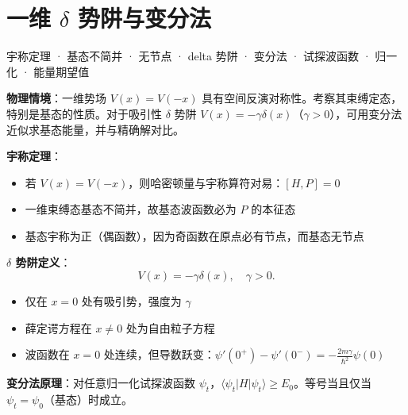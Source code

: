 
\section{一维 $\delta$ 势阱与变分法}
\label{sec:1d-delta-potential}

\begin{tipbox}[关键词标签]
宇称定理 · 基态不简并 · 无节点 · delta 势阱 · 变分法 · 试探波函数 · 归一化 · 能量期望值
\end{tipbox}

\begin{modelbox}[模型：一维对称势场中的束缚态]
\textbf{物理情境}：一维势场 $V(x)=V(-x)$ 具有空间反演对称性。考察其束缚定态，特别是基态的性质。对于吸引性 $\delta$ 势阱 $V(x)=-\gamma\delta(x)$（$\gamma>0$），可用变分法近似求基态能量，并与精确解对比。

\textbf{宇称定理}：
\begin{itemize}[nosep]
    \item 若 $V(x)=V(-x)$，则哈密顿量与宇称算符对易：$[H,P]=0$
    \item 一维束缚态基态不简并，故基态波函数必为 $P$ 的本征态
    \item 基态宇称为正（偶函数），因为奇函数在原点必有节点，而基态无节点
\end{itemize}

\textbf{$\delta$ 势阱定义}：
\[
V(x)=-\gamma\delta(x),\quad\gamma>0.
\]
\begin{itemize}[nosep]
    \item 仅在 $x=0$ 处有吸引势，强度为 $\gamma$
    \item 薛定谔方程在 $x\neq0$ 处为自由粒子方程
    \item 波函数在 $x=0$ 处连续，但导数跃变：$\psi'(0^+)-\psi'(0^-)=-\frac{2m\gamma}{\hbar^2}\psi(0)$
\end{itemize}

\textbf{变分法原理}：对任意归一化试探波函数 $\psi_t$，$\langle\psi_t|H|\psi_t\rangle\geq E_0$。等号当且仅当 $\psi_t=\psi_0$（基态）时成立。
\end{modelbox}

